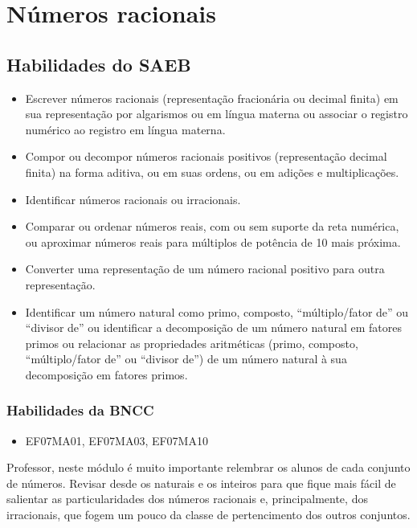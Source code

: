 
\chapter{Números racionais}

\section{Habilidades do SAEB }
\begin{itemize}
\item Escrever números racionais (representação
fracionária ou decimal finita) em sua representação por algarismos ou em
língua materna ou associar o registro numérico ao registro em língua
materna.
\item
  Compor ou decompor números racionais positivos (representação decimal
  finita) na forma aditiva, ou em suas ordens, ou em adições e
  multiplicações.
\item
  Identificar números racionais ou irracionais.
\item
  Comparar ou ordenar números reais, com ou sem suporte da reta
  numérica, ou aproximar números reais para múltiplos de potência de 10
  mais próxima.
\item
  Converter uma representação de um número racional positivo para outra
  representação.
\item
  Identificar um número natural como primo, composto, ``múltiplo/fator
  de'' ou ``divisor de'' ou identificar a decomposição de um número
  natural em fatores primos ou relacionar as propriedades aritméticas
  (primo, composto, ``múltiplo/fator de'' ou ``divisor de'') de um
  número natural à sua decomposição em fatores primos.
\end{itemize}

\subsection{Habilidades da BNCC }

\begin{itemize}
\item EF07MA01, EF07MA03, EF07MA10
\end{itemize}

Professor, neste módulo é muito importante relembrar os alunos de cada
conjunto de números. Revisar desde os naturais e os inteiros para que
fique mais fácil de salientar as particularidades dos números racionais
e, principalmente, dos irracionais, que fogem um pouco da classe de
pertencimento dos outros conjuntos.

